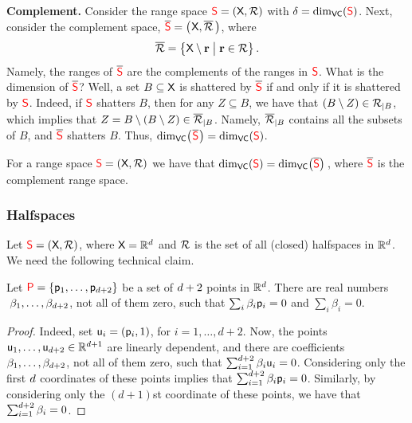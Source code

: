 \bigskip%
\noindent%
\textbf{Complement.}  %
Consider the range space ${\textcolor{red}{\mathsf{S}}} = (\textsf{X}, {\mathcal{R}})$ with
$\delta =\mathrm{dim}_{\mathsf{VC}}({\textcolor{red}{\mathsf{S}}})$. Next, consider the complement space,
$\overline{{\textcolor{red}{\mathsf{S}}}} = \bigl(\hspace{0.6pt}\textsf{X}, \overline{{\mathcal{R}}}\,
\bigr)$, where
\begin{equation*}
    \overline{\RangeSet}%
    =%
    \Set{\GroundSet \setminus \range }{ \range
       \in \RangeSet\bigr. }.
\end{equation*}
Namely, the ranges of $\overline{{\textcolor{red}{\mathsf{S}}}}$ are the complements of
the ranges in ${\textcolor{red}{\mathsf{S}}}$.  What is the \VC dimension of
$\overline{{\textcolor{red}{\mathsf{S}}}}$?  Well, a set $B \subseteq \textsf{X}$ is
shattered by $\overline{{\textcolor{red}{\mathsf{S}}}}$ if and only if it is shattered
by ${\textcolor{red}{\mathsf{S}}}$. Indeed, if ${\textcolor{red}{\mathsf{S}}}$ shatters $B$, then for any
$Z \subseteq B$, we have that
$(B \setminus Z) \in {\mathcal{R}}_{|B}$, which implies that
$Z = {B \setminus  (B \setminus Z)} \in
\overline{{\mathcal{R}}}_{|B}$. Namely,
$\overline{{\mathcal{R}}}_{|B}$ contains all the subsets of $B$,
and $\overline{{\textcolor{red}{\mathsf{S}}}}$ shatters $B$.  Thus,
$\mathrm{dim}_{\mathsf{VC}}\bigl( \hspace{0.6pt} \overline{{\textcolor{red}{\mathsf{S}}}} \hspace{0.6pt} \bigr) = \mathrm{dim}_{\mathsf{VC}}(
{\textcolor{red}{\mathsf{S}}})$.

\begin{lemma}
    For a range space ${\textcolor{red}{\mathsf{S}}} = (\textsf{X}, {\mathcal{R}})$ we have
    that $\VCDim(\RangeSpace) = \VCDim
    \pth{\overline{\RangeSpace}}\,$, where $\overline{{\textcolor{red}{\mathsf{S}}}}$ is
    the complement range space.    
\end{lemma}


\subsubsection{Halfspaces}
Let ${\textcolor{red}{\mathsf{S}}} = (\textsf{X},{\mathcal{R}})$, where
$\textsf{X}=\mathbb{R}^d$ and ${\mathcal{R}}$ is the set of all (closed)
halfspaces in $\mathbb{R}^d$.  We need the following technical claim.

\begin{claim}
    Let ${{\textcolor{red}{\mathsf{P}}}} = \left\{ {\mathsf{p}_1, \ldots, \mathsf{p}_{d+2}} \right\}$ be a set of
    $d+2$ points in $\mathbb{R}^d$.  There are real numbers
    $\;\beta_1, \ldots, \beta_{d+2}$, not all of them zero, such
    that $\sum_i \beta_i \mathsf{p}_i = 0$ and $\sum_i \beta_i = 0$.
\end{claim}

\begin{proof} %
    Indeed, set $\pntA_i = \pth[]{\pnt_i, 1}$, for $i=1,\ldots,
    d+2$. Now, the points $\mathsf{u}_1, \ldots, \mathsf{u}_{d+2} \in
    \mathbb{R}^{d+1}$ are linearly dependent, and there are coefficients
    $\beta_1, \ldots, \beta_{d+2}$, not all of them zero, such
    that $\sum_{i=1}^{d+2} \beta_i \mathsf{u}_i = 0$.  Considering only
    the first $d$ coordinates of these points implies that
    $\sum_{i=1}^{d+2} \beta_i \mathsf{p}_i = 0$. Similarly, by
    considering only the $(d+1)$st coordinate of these points, we have
    that $\sum_{i=1}^{d+2} \beta_i = 0$.
\end{proof}


